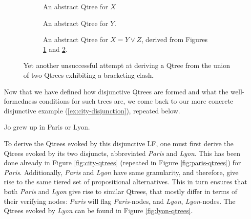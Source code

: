 \begin{figure}[H]
	\centering
	\begin{subfigure}[t]{.3\linewidth}
		\centering
		\caption{An abstract Qtree for $X$}\label{fig:qtree-y''}
	\end{subfigure}
	\hfill
	\begin{subfigure}[t]{.3\linewidth}
		\centering\scalebox{.7}{
			\begin{forest}
				[A[{B}][\fbox{C}][{D}[G][J][K][I]]]
		\end{forest}}
		\caption{An abstract Qtree for $Y$.}\label{fig:qtree-z''}
	\end{subfigure}
	\hfill
	\begin{subfigure}[t]{.3\linewidth}
		\centering{}
		\caption{An abstract Qtree for $X = Y \vee Z$, derived from Figures \ref{fig:qtree-y''} and \ref{fig:qtree-z''}.}\label{fig:qtree-xy-disj-degenerate2}
	\end{subfigure}
	\caption{Yet another unsuccessful attempt at deriving a Qtree from the union of two Qtrees exhibiting a bracketing clash.}\label{fig:qtree-x-y-z-disj-degenerate2}
\end{figure}



Now that we have defined how disjunctive Qtrees are formed and what the well-formedness conditions for such trees are, we come back to our more concrete disjunctive example (\ref{ex:city-disjunction}), repeated below. 

\begin{exe}
		 {Jo grew up in Paris or Lyon.}
\end{exe}

To derive the Qtrees evoked by this disjunctive LF, one must first derive the Qtrees evoked by its two disjuncts, abbreviated \textit{Paris} and \textit{Lyon}. This has been done already in Figure \ref{fig:city-qtrees} (repeated in Figure \ref{fig:paris-qtrees}) for \textit{Paris}. Additionally, \textit{Paris} and \textit{Lyon} have same granularity, and therefore, give rise to the same tiered set of propositional alternatives. This in turn ensures that both \textit{Paris} and \textit{Lyon} give rise to similar Qtrees, that mostly differ in terms of their verifying nodes: \textit{Paris} will flag \textit{Paris}-nodes, and \textit{Lyon}, \textit{Lyon}-nodes. The Qtrees evoked by \textit{Lyon} can be found in Figure \ref{fig:lyon-qtrees}.

